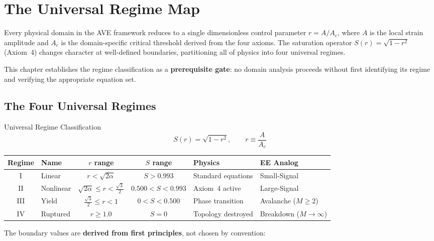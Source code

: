 \chapter{The Universal Regime Map}
\label{ch:regime_map}

Every physical domain in the AVE framework reduces to a single dimensionless control parameter $r = A/A_c$, where $A$ is the local strain amplitude and $A_c$ is the domain-specific critical threshold derived from the four axioms. The saturation operator $S(r) = \sqrt{1 - r^2}$ (Axiom~4) changes character at well-defined boundaries, partitioning all of physics into four universal regimes.

This chapter establishes the regime classification as a \textbf{prerequisite gate}: no domain analysis proceeds without first identifying its regime and verifying the appropriate equation set.

\section{The Four Universal Regimes}

\begin{resultbox}{Universal Regime Classification}
\begin{equation}
    S(r) = \sqrt{1 - r^2}, \qquad r \equiv \frac{A}{A_c}
\end{equation}
\end{resultbox}

\begin{center}
\begin{tabular}{|c|l|c|c|l|l|}
\hline
\textbf{Regime} & \textbf{Name} & \textbf{$r$ range} & \textbf{$S$ range} & \textbf{Physics} & \textbf{EE Analog} \\ \hline
I   & Linear     & $r < \sqrt{2\alpha}$        & $S > 0.993$       & Standard equations  & Small-Signal \\
II  & Nonlinear  & $\sqrt{2\alpha} \leq r < \frac{\sqrt{3}}{2}$ & $0.500 < S < 0.993$ & Axiom~4 active  & Large-Signal \\
III & Yield      & $\frac{\sqrt{3}}{2} \leq r < 1$ & $0 < S < 0.500$   & Phase transition  & Avalanche ($M \geq 2$) \\
IV  & Ruptured   & $r \geq 1.0$       & $S = 0$           & Topology destroyed  & Breakdown ($M \to \infty$) \\ \hline
\end{tabular}
\end{center}

\noindent The boundary values are \textbf{derived from first principles}, not chosen by convention:

